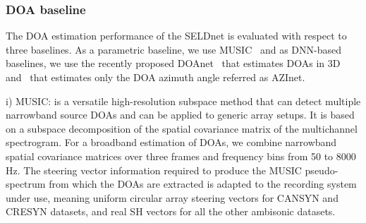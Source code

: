 \documentclass[journal]{IEEEtran}
\begin{document}
\begin{table}[t]
\centering
\caption{Baseline and proposed method summary}

\label{T:baseline}
\end{table}

\subsubsection{DOA baseline}
\label{music_baseline}
The DOA estimation performance of the SELDnet is evaluated with respect to three baselines. As a parametric baseline, we use MUSIC~\cite{Schmidt1986} and as DNN-based baselines, we use the recently proposed DOAnet~\cite{Adavanne2018_EUSIPCO} that estimates DOAs in 3D and~\cite{Chakrabarty2017_nips} that estimates only the DOA azimuth angle referred as AZInet. 

i) MUSIC: is a versatile high-resolution subspace method that can detect multiple narrowband source DOAs and can be applied to generic array setups. It is based on a subspace decomposition of the spatial covariance matrix of the multichannel spectrogram. For a broadband estimation of DOAs, we combine narrowband spatial covariance matrices over three frames and frequency bins from 50 to 8000 Hz. The steering vector information required to produce the MUSIC pseudo-spectrum from which the DOAs are extracted is adapted to the recording system under use, meaning uniform circular array steering vectors for CANSYN and CRESYN datasets, and real SH vectors for all the other ambisonic datasets.
\end{document}
